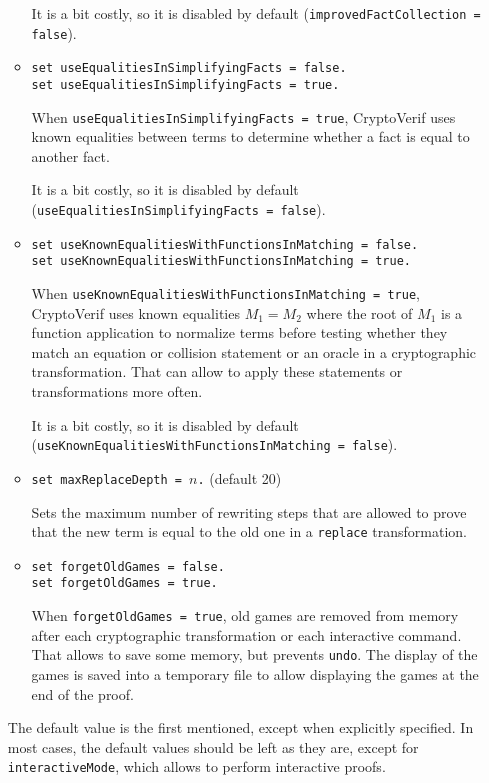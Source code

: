 \begin{itemize}
\begin{itemize}
It is a bit costly, so it is disabled by default
(\texttt{improvedFactCollection = false}).

\item \texttt{set useEqualitiesInSimplifyingFacts = false.}\\
\texttt{set useEqualitiesInSimplifyingFacts = true.}

When \texttt{useEqualitiesInSimplifyingFacts = true}, CryptoVerif
uses known equalities between terms to determine whether a fact
is equal to another fact.

It is a bit costly, so it is disabled by default
(\texttt{useEqualitiesInSimplifyingFacts = false}).

\item \texttt{set useKnownEqualitiesWithFunctionsInMatching = false.}\\
\texttt{set useKnownEqualitiesWithFunctionsInMatching = true.}

When \texttt{useKnownEqualitiesWithFunctionsInMatching = true}, CryptoVerif
uses known equalities $M_1 = M_2$ where the root of $M_1$ is a function 
application to normalize terms before testing whether they match
an equation or collision statement or an oracle in a cryptographic
transformation. That can allow to apply these statements or transformations
more often.

It is a bit costly, so it is disabled by default
(\texttt{useKnownEqualitiesWithFunctionsInMatching = false}).

\item \texttt{set maxReplaceDepth = $n$.} (default 20)

Sets the maximum number of rewriting steps that are allowed 
to prove that the new term is equal to the old one in a 
\texttt{replace} transformation. 

\item \texttt{set forgetOldGames = false.}\\
\texttt{set forgetOldGames = true.}

When \texttt{forgetOldGames = true}, old games are removed from memory after each
cryptographic transformation or each interactive command.  
That allows to save some memory, but prevents \texttt{undo}.
The display of the games is saved into a temporary file to allow
displaying the games at the end of the proof.

\end{itemize}
The default value is the first mentioned, except when explicitly specified.
In most cases, the default values should be left as they are, except
for {\tt interactiveMode}, which allows to perform 
interactive proofs.


\end{itemize}
